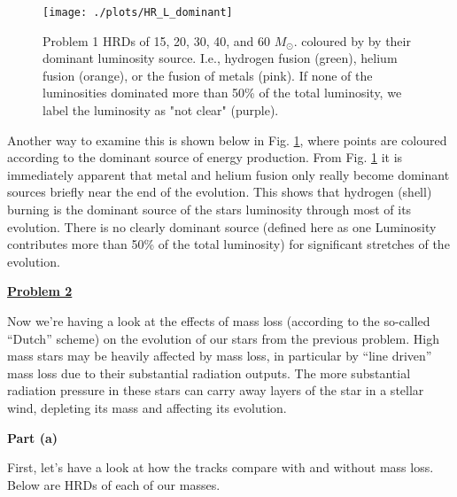 \documentclass[11pt]{article}
\newcommand{\msol}{M_\odot}
\renewcommand{\section}[1]{\textbf{\underline{#1}}}
\begin{document}
\begin{figure}
\center
\texttt{[image: ./plots/HR\_L\_dominant]}
\caption{Problem 1 HRDs of 15, 20, 30, 40, and 60 $\msol$. coloured by by their dominant luminosity source.  I.e., hydrogen
      fusion (green),  helium fusion (orange), or the fusion of metals (pink). If none of the luminosities dominated more than 50\% of the total luminosity, we label the luminosity as "not clear" (purple).}
    \label{fig:p1_a2}
\end{figure}

Another way to examine this is shown below in Fig. \ref{fig:p1_a2}, where points are coloured according to the dominant source of energy production.
From Fig. \ref{fig:p1_a2} it is immediately apparent that metal and helium fusion only really become dominant sources briefly near the end of the evolution. 
This shows that hydrogen (shell) burning  is the dominant source of the stars luminosity through most of its evolution. There is no clearly dominant source (defined here as one Luminosity contributes more than 50\% of the total luminosity) for significant stretches of the evolution.


\vspace{0.1in}
\section{Problem 2}
\vspace{0.1in}

Now we're having a look at the effects of mass loss (according to the so-called ``Dutch'' scheme) on the evolution of our stars from the previous problem. High mass stars may be heavily affected by mass loss, in particular by ``line driven'' mass loss due to their substantial radiation outputs. The more substantial radiation pressure in these stars can carry away layers of the star in a stellar wind, depleting its mass and affecting its evolution.

\vspace{0.1in}
\noindent
\textbf{Part (a)}
\vspace{0.1in}

First, let's have a look at how the tracks compare with and without mass loss. Below are HRDs of each of our masses.
\end{document}
